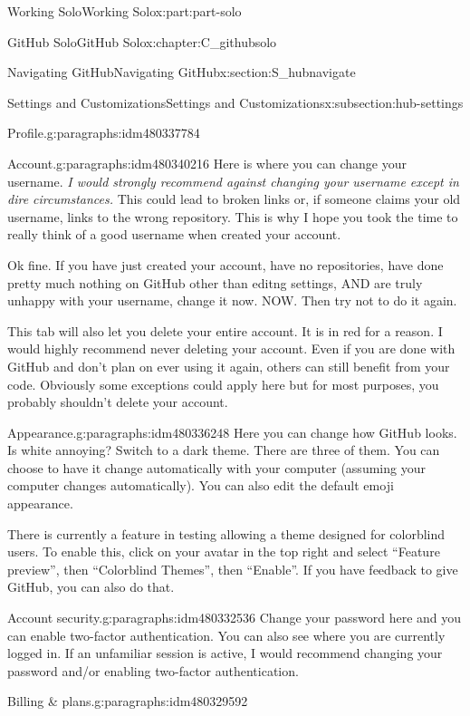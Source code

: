 \documentclass[oneside,10pt,]{book}
\begin{document}
\begin{partptx}{Working Solo}{}{Working Solo}{}{}{x:part:part-solo}
\begin{chapterptx}{GitHub Solo}{}{GitHub Solo}{}{}{x:chapter:C_githubsolo}
\begin{sectionptx}{Navigating GitHub}{}{Navigating GitHub}{}{}{x:section:S_hubnavigate}
\begin{subsectionptx}{Settings and Customizations}{}{Settings and Customizations}{}{}{x:subsection:hub-settings}
\begin{paragraphs}{Profile.}{g:paragraphs:idm480337784}
\end{paragraphs}%
\begin{paragraphs}{Account.}{g:paragraphs:idm480340216}%
%
Here is where you can change your username. \emph{I would strongly recommend against changing your username except in dire circumstances.} This could lead to broken links or, if someone claims your old username, links to the wrong repository. This is why I hope you took the time to really think of a good username when created your account.%
\par
Ok fine. If you have just created your account, have no repositories, have done pretty much nothing on GitHub other than editng settings, AND are truly unhappy with your username, change it now. NOW. Then try not to do it again.%
\par
This tab will also let you delete your entire account. It is in red for a reason. I would highly recommend never deleting your account. Even if you are done with GitHub and don't plan on ever using it again, others can still benefit from your code. Obviously some exceptions could apply here but for most purposes, you probably shouldn't delete your account.%
\end{paragraphs}%
\begin{paragraphs}{Appearance.}{g:paragraphs:idm480336248}%
%
Here you can change how GitHub looks. Is white annoying? Switch to a dark theme. There are three of them. You can choose to have it change automatically with your computer (assuming your computer changes automatically). You can also edit the default emoji appearance.%
\par
There is currently a feature in testing allowing a theme designed for colorblind users. To enable this, click on your avatar in the top right and select ``Feature preview'', then ``Colorblind Themes'', then ``Enable''. If you have feedback to give GitHub, you can also do that.%
\end{paragraphs}%
\begin{paragraphs}{Account security.}{g:paragraphs:idm480332536}%
%
Change your password here and you can enable two-factor authentication. You can also see where you are currently logged in. If an unfamiliar session is active, I would recommend changing your password and\slash{}or enabling two-factor authentication.%
\end{paragraphs}%
\begin{paragraphs}{Billing \& plans.}{g:paragraphs:idm480329592}%
%

\end{paragraphs}
\end{subsectionptx}
\end{sectionptx}
\end{chapterptx}
\end{partptx}
\end{document}
